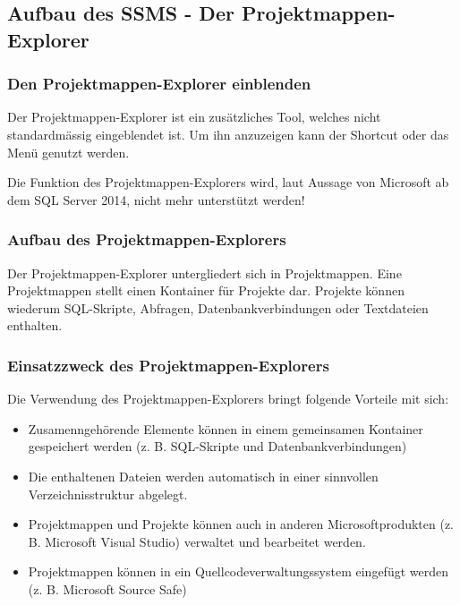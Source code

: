       \subsection{Aufbau des SSMS - Der Projektmappen-Explorer}
        \subsubsection{Den Projektmappen-Explorer einblenden}
          Der Projektmappen-Explorer ist ein zusätzliches Tool, welches nicht
          standardmässig eingeblendet ist. Um ihn anzuzeigen kann der Shortcut
           oder das Menü  genutzt
          werden.
          \begin{merke}
            Die Funktion des Projektmappen-Explorers wird, laut Aussage von
            Microsoft ab dem SQL Server 2014, nicht mehr unterstützt werden!
          \end{merke}
        \subsubsection{Aufbau des Projektmappen-Explorers}
          Der Projektmappen-Explorer untergliedert sich in Projektmappen. Eine
          Projektmappen stellt einen Kontainer f\"ur Projekte dar.
          Projekte können wiederum SQL-Skripte, Abfragen, Datenbankverbindungen
          oder Textdateien enthalten.
        \subsubsection{Einsatzzweck des Projektmappen-Explorers}
          Die Verwendung des Projektmappen-Explorers bringt folgende Vorteile
          mit sich:
          \begin{itemize}
            \item Zusamenngehörende Elemente können in einem gemeinsamen
            Kontainer gespeichert werden (z. B. SQL-Skripte und
            Datenbankverbindungen)
            \item Die enthaltenen Dateien werden automatisch in einer sinnvollen
            Verzeichnisstruktur abgelegt.
            \item Projektmappen und Projekte können auch in anderen
            Microsoftprodukten (z. B. Microsoft Visual Studio) verwaltet und
            bearbeitet werden.
            \item Projektmappen können in ein Quellcodeverwaltungssystem
            eingefügt werden (z. B. Microsoft Source Safe)
          \end{itemize}
